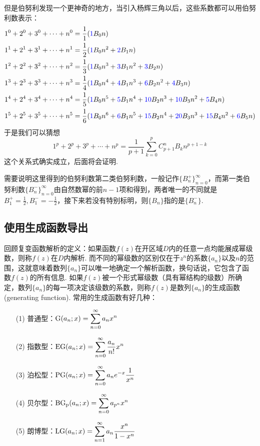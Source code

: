 \documentclass[main.tex]{subfiles}
\begin{document}
但是伯努利发现一个更神奇的地方，当引入杨辉三角以后，这些系数都可以用伯努利数表示：
\begin{align*}
    1^0+2^0+3^0+ \cdots +n^0 &= \frac{1}{1}({\color{blue}1}B_0n) \\
    1^1+2^1+3^1+ \cdots +n^1 &= \frac{1}{2}({\color{blue}1}B_0n^2+{\color{blue}2}B_1n) \\
    1^2+2^2+3^2+ \cdots +n^2 &= \frac{1}{3}({\color{blue}1}B_0n^3+{\color{blue}3}B_1n^2+{\color{blue}3}B_2n) \\
    1^3+2^3+3^3+ \cdots +n^3 &= \frac{1}{4}({\color{blue}1}B_0n^4+{\color{blue}4}B_1n^3+{\color{blue}6}B_2n^2+{\color{blue}4}B_3n) \\
    1^4+2^4+3^4+ \cdots +n^4 &= \frac{1}{5}({\color{blue}1}B_0n^5+{\color{blue}5}B_1n^4+{\color{blue}10}B_2n^3+{\color{blue}10}B_3n^2+{\color{blue}5}B_4n) \\
    1^5+2^5+3^5+ \cdots +n^5 &= \frac{1}{6}({\color{blue}1}B_0n^6+{\color{blue}6}B_1n^5+{\color{blue}15}B_2n^4+{\color{blue}20}B_3n^3+{\color{blue}15}B_4n^2+{\color{blue}6}B_5n)
\end{align*}
于是我们可以猜想
\[1^p+2^p+3^p+ \cdots +n^p = \frac{1}{p+1}\sum_{k=0}^{p}C_{p+1}^{n}B_kn^{p+1-k}\]
这个关系式确实成立，后面将会证明.

需要说明这里得到的伯努利数第二类伯努利数，一般记作\(\{B_{n}^+\}_{n=0}^{\infty}\)，而第一类伯努利数\(\{B_n^-\}_{n=0}^{\infty}\)由自然数幂的前\(n-1\)项和得到，两者唯一的不同就是\(\displaystyle{B_1^+ = \frac{1}{2}, B_1^- = -\frac{1}{2}}\)，接下来若没有特别标明，则\(\{B_n\}\)指的是\(\{B_n^-\}\).

\subsection{使用生成函数导出}

回顾复变函数解析的定义：如果函数\(f(z)\)在开区域\(D\)内的任意一点均能展成幂级数，则称\(f(z)\)在\(D\)内解析. 而不同的幂级数的区别仅在于\(z^n\)的系数\(\{a_n\}\)以及\(n\)的范围，这就意味着数列\(\{a_n\}\)可以唯一地确定一个解析函数，换句话说，它包含了函数\(f(z)\)的所有信息. 如果\(f(z)\)被一个形式幂级数（具有幂结构的级数）所确定，数列\(\{a_n\}\)的每一项决定该级数的系数，则称\(f(z)\)是数列\(\{a_n\}\)的生成函数(generating function). 常用的生成函数有好几种：
\begin{itemize}
    \item[(1)] 普通型：\(\displaystyle{{\rm G}(a_n;x) = \sum_{n=0}^{\infty}a_nx^n}\)
    \item[(2)] 指数型：\(\displaystyle{{\rm EG}(a_n;x) = \sum_{n=0}^{\infty}\frac{a_n}{n!}x^n}\)
    \item[(3)] 泊松型：\(\displaystyle{{\rm PG}(a_n;x) = \sum_{n=0}^{\infty} a_ne^{-x}\frac{1}{x^n}}\) 
    \item[(4)] 贝尔型：\(\displaystyle{{\rm BG_p}(a_n;x) = \sum_{n=0}^{\infty} a_{p^n}x^n}\) 
    \item[(5)] 朗博型：\(\displaystyle{{\rm LG}(a_n;x) = \sum_{n=1}^{\infty}a_n\frac{x^n}{1-x^n}}\)
\end{itemize}
\end{document}
